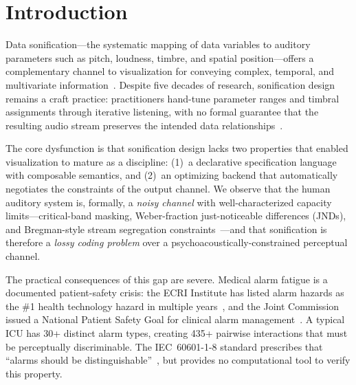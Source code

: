 \documentclass[sigchi, nonacm]{acmart}
\begin{document}


\maketitle

\section{Introduction}
\label{sec:intro}

Data sonification---the systematic mapping of data variables to auditory parameters such as pitch, loudness, timbre, and spatial position---offers a complementary channel to visualization for conveying complex, temporal, and multivariate information~\cite{hermann2011sonification, kramer1999sonification}. Despite five decades of research, sonification design remains a craft practice: practitioners hand-tune parameter ranges and timbral assignments through iterative listening, with no formal guarantee that the resulting audio stream preserves the intended data relationships~\cite{walker2011theory}.

The core dysfunction is that sonification design lacks two properties that enabled visualization to mature as a discipline: (1)~a declarative specification language with composable semantics, and (2)~an optimizing backend that automatically negotiates the constraints of the output channel. We observe that the human auditory system is, formally, a \emph{noisy channel} with well-characterized capacity limits---critical-band masking, Weber-fraction just-noticeable differences (JNDs), and Bregman-style stream segregation constraints~\cite{bregman1990auditory, zwicker2013psychoacoustics}---and that sonification is therefore a \emph{lossy coding problem} over a psychoacoustically-constrained perceptual channel.

The practical consequences of this gap are severe. Medical alarm fatigue is a documented patient-safety crisis: the ECRI Institute has listed alarm hazards as the \#1 health technology hazard in multiple years~\cite{ecri2014alarms}, and the Joint Commission issued a National Patient Safety Goal for clinical alarm management~\cite{jointcommission2014alarms}. A typical ICU has 30+ distinct alarm types, creating 435+ pairwise interactions that must be perceptually discriminable. The IEC~60601-1-8 standard prescribes that ``alarms should be distinguishable''~\cite{iec60601}, but provides no computational tool to verify this property.
\end{document}
